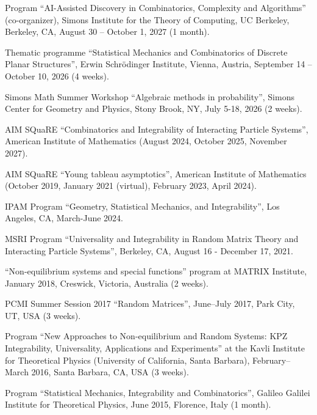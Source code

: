 \documentclass[letterpaper,11pt]{article}
\begin{document}
\begin{etaremune}
\item
Program ``AI-Assisted Discovery in Combinatorics, Complexity and Algorithms'' (co-organizer),
Simons Institute for the Theory of Computing, UC Berkeley, Berkeley, CA,
August 30 -- October 1, 2027 (1 month).
\item
Thematic programme ``Statistical Mechanics and Combinatorics of Discrete Planar Structures'',
Erwin Schr\"odinger Institute, Vienna, Austria,
September 14 -- October 10, 2026 (4 weeks).
\item
Simons Math Summer Workshop ``Algebraic methods in probability'',
Simons Center for Geometry and Physics, Stony Brook, NY,
July 5-18, 2026 (2 weeks).
\item AIM SQuaRE ``Combinatorics and Integrability of Interacting Particle Systems'', American Institute of Mathematics (August 2024, October 2025, November 2027).
\item AIM SQuaRE ``Young tableau asymptotics'', American Institute of Mathematics (October 2019, January 2021 (virtual), February 2023, April 2024).
	\item
	IPAM Program ``Geometry, Statistical Mechanics, and Integrability'',
	Los Angeles, CA,
	March-June 2024.
	\item
	MSRI Program ``Universality and Integrability in Random Matrix Theory and Interacting Particle Systems'', Berkeley, CA, August 16 - December 17, 2021.
	\item
		``Non-equilibrium systems and special functions'' program at MATRIX Institute,
		January 2018,
		Creswick, Victoria, Australia (2 weeks).
	\item
	      PCMI Summer Session 2017 ``Random Matrices'', June--July 2017,
	      Park City, UT, USA (3 weeks).
	\item
	      Program ``New Approaches to Non-equilibrium and Random Systems:
	      KPZ Integrability, Universality, Applications and Experiments'' at the Kavli
	      Institute for Theoretical Physics (University of California, Santa Barbara),
	      February--March 2016, Santa Barbara, CA, USA (3 weeks).
	\item
	      Program ``Statistical Mechanics, Integrability and
	      Combinatorics'', Galileo Galilei Institute for Theoretical Physics, June 2015,
	      Florence, Italy (1 month).
\end{etaremune}

\end{document}
